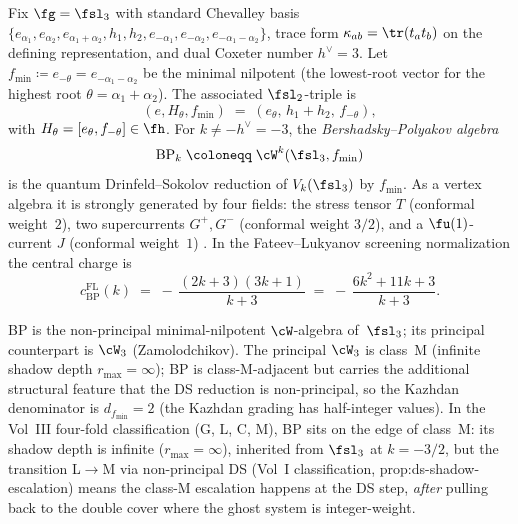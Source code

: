 \begin{definition}
\label{def:bp-bershadsky-polyakov}
Fix $\fg = \fsl_3$ with standard Chevalley basis
$\{e_{\alpha_1}, e_{\alpha_2}, e_{\alpha_1+\alpha_2}, h_1, h_2,
 e_{-\alpha_1}, e_{-\alpha_2}, e_{-\alpha_1-\alpha_2}\}$,
trace form $\kappa_{ab} = \tr(t_a t_b)$ on the defining
representation, and dual Coxeter number $h^{\vee} = 3$. Let
$f_{\min} \coloneqq e_{-\theta} = e_{-\alpha_1 - \alpha_2}$ be the
minimal nilpotent (the lowest-root vector for the highest root
$\theta = \alpha_1 + \alpha_2$). The associated
$\fsl_2$-triple is
\[
 (e, H_{\theta}, f_{\min}) \;=\; (e_{\theta},\, h_1 + h_2,\, f_{-\theta}),
\]
with $H_{\theta} = [e_{\theta}, f_{-\theta}] \in \fh$.
For $k \ne -h^{\vee} = -3$, the \emph{Bershadsky--Polyakov algebra}
\[
 \mathrm{BP}_k \;\coloneqq\; \cW^{k}(\fsl_3, f_{\min})
\]
is the quantum Drinfeld--Sokolov reduction of $V_k(\fsl_3)$ by
$f_{\min}$. As a vertex algebra it is strongly generated by four
fields: the stress tensor $T$ (conformal weight~$2$), two
supercurrents $G^{+}, G^{-}$ (conformal weight $3/2$), and a
$\fu(1)$-current $J$ (conformal weight~$1$)
\cite{Bershadsky91, Polyakov90, deBoerTjin93, KacRoanWakimoto03,
 Arakawa05BP}.
In the Fateev--Lukyanov screening normalization the central charge is
\begin{equation}\label{eq:bp-central-charge-FL}
 c^{\mathrm{FL}}_{\mathrm{BP}}(k)
 \;=\; -\,\frac{(2k+3)(3k+1)}{k+3}
 \;=\; -\,\frac{6k^2 + 11k + 3}{k+3}.
\end{equation}
\end{definition}

\begin{remark}
\label{rem:bp-shadow-class}
BP is the non-principal minimal-nilpotent $\cW$-algebra of~$\fsl_3$;
its principal counterpart is $\cW_3$ (Zamolodchikov). The
principal $\cW_3$ is class~M (infinite shadow depth $r_{\max} = \infty$);
BP is class-M-adjacent but carries the additional structural
feature that the DS reduction is non-principal, so the Kazhdan
denominator is $d_{f_{\min}} = 2$ (the Kazhdan grading has
half-integer values). In the Vol~III four-fold classification
(G, L, C, M), BP sits on the edge of class~M: its shadow depth is
infinite ($r_{\max} = \infty$), inherited from $\fsl_3$ at
$k = -3/2$, but the transition L$\to$M via non-principal DS
(Vol~I classification, prop:ds-shadow-escalation) means the class-M
escalation happens at the DS step, \emph{after} pulling back to the
double cover where the ghost system is integer-weight.
\end{remark}

